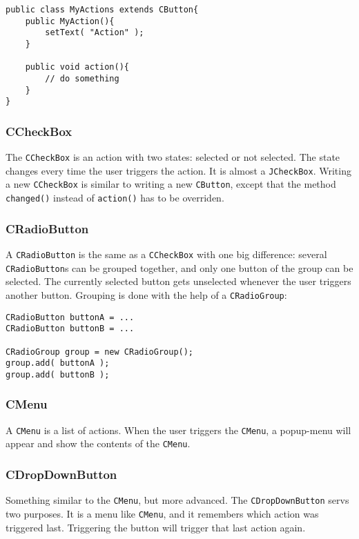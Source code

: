 \documentclass[a4paper,10pt]{article}
\newcommand{\src}[1]{\lstinline[basicstyle=\ttfamily]|#1|}
\begin{document}
\begin{lstlisting}
public class MyActions extends CButton{
	public MyAction(){
		setText( "Action" );
	}

	public void action(){
		// do something
	}
}
\end{lstlisting}

\subsubsection{CCheckBox}
The \src{CCheckBox} is an action with two states: selected or not selected. The state changes every time the user triggers the action. It is almost a \src{JCheckBox}. Writing a new \src{CCheckBox} is similar to writing a new \src{CButton}, except that the method \src{changed()} instead of \src{action()} has to be overriden.

\subsubsection{CRadioButton}
A \src{CRadioButton} is the same as a \src{CCheckBox} with one big difference: several \src{CRadioButton}s can be grouped together, and only one button of the group can be selected. The currently selected button gets unselected whenever the user triggers another button. Grouping is done with the help of a \src{CRadioGroup}:
\begin{lstlisting}
CRadioButton buttonA = ...
CRadioButton buttonB = ...

CRadioGroup group = new CRadioGroup();
group.add( buttonA );
group.add( buttonB );
\end{lstlisting}

\subsubsection{CMenu}
A \src{CMenu} is a list of actions. When the user triggers the \src{CMenu}, a popup-menu will appear and show the contents of the \src{CMenu}.

\subsubsection{CDropDownButton}
Something similar to the \src{CMenu}, but more advanced. The \src{CDropDownButton} servs two purposes. It is a menu like \src{CMenu}, and it remembers which action was triggered last. Triggering the button will trigger that last action again.
\end{document}
